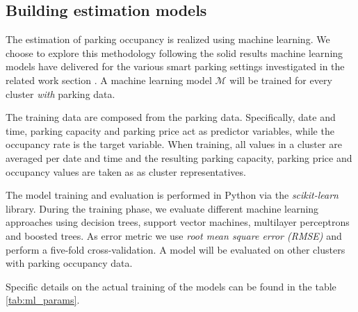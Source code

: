\documentclass{ws-ijait}
\newcommand{\cmmnt}[1]{\ignorespaces}
\begin{document}
		\subsection{Building estimation models}
		The estimation of parking occupancy is realized using machine learning. We choose to explore this methodology following the solid results machine learning models have delivered for the various smart parking settings investigated in the related work section \cmmnt{\cref{sec:relwork}}. A machine learning model $\mathcal{M}$ will be trained for every cluster \textit{with} parking data.
		
		The training data are composed from the parking data. Specifically, date and time, parking capacity and parking price act as predictor variables, while the occupancy rate is the target variable. When training, all values in a cluster are averaged per date and time and the resulting parking capacity, parking price and occupancy values are taken as as cluster representatives.
		
		The model training and evaluation is performed in Python via the \textit{scikit-learn} library. During the training phase, we evaluate different machine learning approaches using decision trees, support vector machines, multilayer perceptrons and boosted trees. As error metric we use \textit{root mean square error (RMSE)} and perform a five-fold cross-validation. A model will be evaluated on other clusters with parking occupancy data.
		
		Specific details on the actual training of the models can be found in the table \cref{tab:ml_params}.
		
\end{document}
